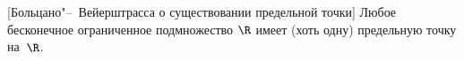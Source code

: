 [Больцано"--~Вейерштрасса о существовании предельной точки]\label{bolc} Любое бесконечное ограниченное подмножество  $\R$ имеет (хоть одну) предельную точку на~$\R$.

